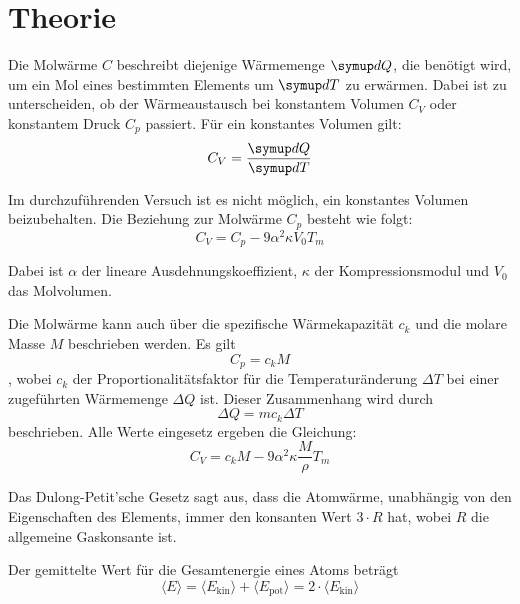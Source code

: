 \section{Theorie}
\label{sec:Theorie}


Die Molwärme $C$ beschreibt diejenige Wärmemenge $\symup dQ$, die benötigt wird, um ein Mol eines bestimmten Elements um 
$\symup dT$ zu erwärmen. Dabei ist zu unterscheiden, ob der Wärmeaustausch bei konstantem Volumen $C_V$ oder konstantem Druck $C_p$
passiert. Für ein konstantes Volumen gilt:
\begin{equation}
    C_V = \frac{\symup dQ}{\symup dT} 
\end{equation}

Im durchzuführenden Versuch ist es nicht möglich, ein konstantes Volumen beizubehalten. Die Beziehung zur Molwärme $C_p$ besteht wie 
folgt:
\begin{equation}
    C_V = C_p - 9 \alpha^2 \kappa V_0 T_m 
\end{equation}

Dabei ist $\alpha$ der lineare Ausdehnungskoeffizient, $\kappa$ der Kompressionsmodul und $V_0$ das Molvolumen.

Die Molwärme kann auch über die spezifische Wärmekapazität $c_k$ und die molare Masse $M$ beschrieben werden. Es gilt 
\begin{equation}
    C_p = c_k M
\end{equation},
wobei $c_k$ der Proportionalitätsfaktor für die Temperaturänderung $\Delta T$ bei einer zugeführten Wärmemenge $\Delta Q$ ist. 
Dieser Zusammenhang wird durch 
\begin{equation}
    \Delta Q = m c_k \Delta T
\end{equation}
beschrieben.
Alle Werte eingesetz ergeben die Gleichung:
\begin{equation}
   C_V = c_k M - 9 \alpha^2 \kappa \frac{M}{\rho} T_m 
   \label{eqn:C_V}
\end{equation}


Das Dulong-Petit'sche Gesetz sagt aus, dass die Atomwärme, unabhängig von den Eigenschaften des Elements, immer den
konsanten Wert $3\cdot R$ hat, wobei $R$ die allgemeine Gaskonsante ist. 

Der gemittelte Wert für die Gesamtenergie eines Atoms beträgt 
\begin{equation}
    \langle E \rangle = \langle E_\text{kin} \rangle + \langle E_\text{pot} \rangle = 2\cdot \langle E_\text{kin} \rangle
\end{equation}

